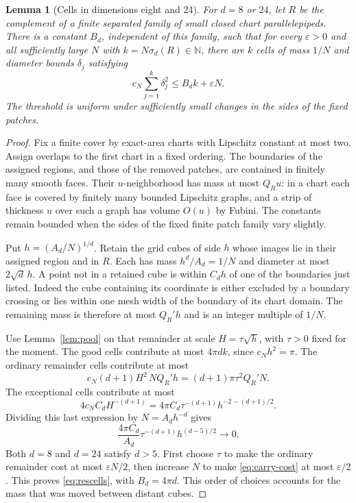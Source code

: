 \documentclass[11pt,a4paper]{article}
\newtheorem{lemma}[theorem]{Lemma}
\theoremstyle{definition}
\newcommand{\N}{\mathbb N}
\numberwithin{equation}{section}
\begin{document}
\begin{lemma}[Cells in dimensions eight and 24]\label{lem:high-dimensional-cells}
For $d=8$ or $24$, let $R$ be the complement of a finite separated family of small closed chart parallelepipeds. There is a constant $B_d$, independent of this family, such that for every $\varepsilon>0$ and all sufficiently large $N$ with $k=N\sigma_d(R)\in\N$, there are $k$ cells of mass $1/N$ and diameter bounds $\delta_j$ satisfying
\begin{equation}\label{eq:rescells}
 c_N\sum_{j=1}^k\delta_j^2\le B_d k+\varepsilon N.
\end{equation}
The threshold is uniform under sufficiently small changes in the sides of the fixed patches.
\end{lemma}
\begin{proof}
Fix a finite cover by exact-area charts with Lipschitz constant at most two. Assign overlaps to the first chart in a fixed ordering. The boundaries of the assigned regions, and those of the removed patches, are contained in finitely many smooth faces. Their $u$-neighborhood has mass at most $Q_Ru$: in a chart each face is covered by finitely many bounded Lipschitz graphs, and a strip of thickness $u$ over such a graph has volume $O(u)$ by Fubini. The constants remain bounded when the sides of the fixed finite patch family vary slightly.

Put $h=(A_d/N)^{1/d}$. Retain the grid cubes of side $h$ whose images lie in their assigned region and in $R$. Each has mass $h^d/A_d=1/N$ and diameter at most $2\sqrt d\,h$. A point not in a retained cube is within $C_dh$ of one of the boundaries just listed. Indeed the cube containing its coordinate is either excluded by a boundary crossing or lies within one mesh width of the boundary of its chart domain. The remaining mass is therefore at most $Q_R'h$ and is an integer multiple of $1/N$.

Use Lemma~\ref{lem:pool} on that remainder at scale $H=\tau\sqrt h$, with $\tau>0$ fixed for the moment. The good cells contribute at most $4\pi d k$, since $c_Nh^2=\pi$. The ordinary remainder cells contribute at most
\[
 c_N(d+1)H^2\,NQ_R'h=(d+1)\pi\tau^2Q_R'N.
\]
The exceptional cells contribute at most
\[
 4c_N C_d H^{-(d+1)}
       =4\pi C_d\tau^{-(d+1)}h^{-2-(d+1)/2}.
\]
Dividing this last expression by $N=A_dh^{-d}$ gives
\begin{equation}\label{eq:carry-cost}
 \frac{4\pi C_d}{A_d}\tau^{-(d+1)}h^{(d-5)/2}\longrightarrow0.
\end{equation}
Both $d=8$ and $d=24$ satisfy $d>5$. First choose $\tau$ to make the ordinary remainder cost at most $\varepsilon N/2$, then increase $N$ to make \eqref{eq:carry-cost} at most $\varepsilon/2$. This proves \eqref{eq:rescells}, with $B_d=4\pi d$. This order of choices accounts for the mass that was moved between distant cubes.
\end{proof}
\end{document}
